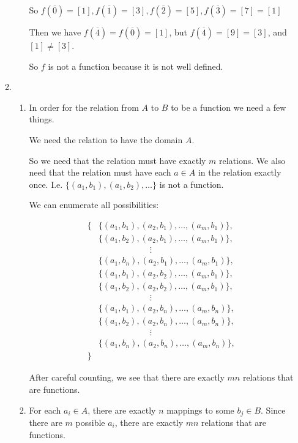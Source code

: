 \documentclass[12pt,letterpaper]{article}
\begin{document}
\begin{enumerate}
\begin{enumerate}
\begin{enumerate}
              So $f\left(\overline{0}\right) = [1], f\left(\overline{1}\right) = [3], f\left(\overline{2}\right) = [5], f\left(\overline{3}\right) = [7] = [1]$

              Then we have $f\left(\overline{4}\right) = f\left(\overline{0}\right) = [1]$,
              but $f\left(\overline{4}\right) = [9] = [3]$, and $[1] \neq [3]$.

              So $f$ is not a function because it is not well defined.
          \end{enumerate}
        \setcounter{enumii}{16}
        \item
          \begin{enumerate}
            \item
              In order for the relation from $A$ to $B$ to be a function we need a few things.

              We need the relation to have the domain $A$.

              So we need that the relation must have exactly $m$ relations.
              We also need that the relation must have each $a \in A$ in the relation exactly once.
              I.e. $\{(a_1, b_1), (a_1, b_2), \dots\}$ is not a function.

              We can enumerate all possibilities:

              \begin{align*}
                \{
                  &\{ (a_1, b_1), (a_2, b_1), \dots, (a_m, b_1) \}, \\
                  &\{ (a_1, b_2), (a_2, b_1), \dots, (a_m, b_1) \}, \\
                  & \quad \quad \quad \quad \quad \quad \vdots \\
                  &\{ (a_1, b_n), (a_2, b_1), \dots, (a_m, b_1) \}, \\
                  &\{ (a_1, b_1), (a_2, b_2), \dots, (a_m, b_1) \}, \\
                  &\{ (a_1, b_2), (a_2, b_2), \dots, (a_m, b_1) \}, \\
                  & \quad \quad \quad \quad \quad \quad \vdots \\
                  &\{ (a_1, b_1), (a_2, b_n), \dots, (a_m, b_n) \}, \\
                  &\{ (a_1, b_2), (a_2, b_n), \dots, (a_m, b_n) \}, \\
                  & \quad \quad \quad \quad \quad \quad \vdots \\
                  &\{ (a_1, b_n), (a_2, b_n), \dots, (a_m, b_n) \}, \\
                \}
              \end{align*}

              After careful counting, we see that there are exactly $mn$ relations that are functions.
            \item
              For each $a_i \in A$, there are exactly $n$ mappings to some $b_j \in B$. Since there are $m$ possible $a_i$, there are exactly $mn$ relations that are functions.
          \end{enumerate}
      \end{enumerate}
  \end{enumerate}
\end{document}
